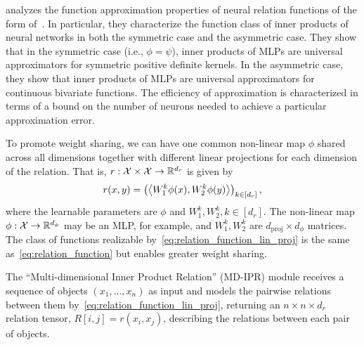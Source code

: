 \citep{altabaaApproximationRelationFunctions2024} analyzes the function approximation properties of neural relation functions of the form of~. In particular, they characterize the function class of inner products of neural networks in both the symmetric case and the asymmetric case. They show that in the symmetric case (i.e., $\phi = \psi$), inner products of MLPs are universal approximators for symmetric positive definite kernels. In the asymmetric case, they show that inner products of MLPs are universal approximators for continuous bivariate functions. The efficiency of approximation is characterized in terms of a bound on the number of neurons needed to achieve a particular approximation error.

To promote weight sharing, we can have one common non-linear map $\phi$ shared across all dimensions together with different linear projections for each dimension of the relation. That is, $r: {\mathcal{X}} \times {\mathcal{X}} \to \mathbb{R}^{d_r}$ is given by
\begin{equation}\label{eq:relation_function_lin_proj}
    r(x, y) = \left(\left \langle W_1^{k}\phi(x), W_2^{k}\phi(y) \right\rangle\right)_{k \in [d_r]},
\end{equation}
where the learnable parameters are $\phi$ and $W_1^{k}, W_2^{k}, k \in [d_r]$. The non-linear map $\phi: {\mathcal{X}} \to \mathbb{R}^{d_\phi}$ may be an MLP, for example, and $W_1^{k}, W_2^{k}$ are $d_{\mathrm{proj}} \times d_\phi$ matrices. The class of functions realizable by~\cref{eq:relation_function_lin_proj} is the same as~\cref{eq:relation_function} but enables greater weight sharing.

The ``Multi-dimensional Inner Product Relation'' (MD-IPR) module receives a sequence of objects $(x_1, \ldots, x_n)$ as input and models the pairwise relations between them by~\cref{eq:relation_function_lin_proj}, returning an $n \times n \times d_r$ relation tensor, $R[i,j] = r(x_i, x_j)$, describing the relations between each pair of objects.
